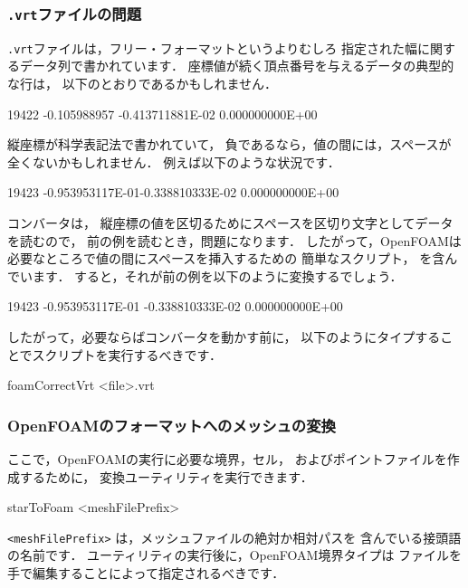 \subsubsection{\texttt{.vrt}ファイルの問題}
\label{sssec:5.5.2.6}
\texttt{.vrt}ファイルは，フリー・フォーマットというよりむしろ
指定された幅に関するデータ列で書かれています．
座標値が続く頂点番号を与えるデータの典型的な行は，
以下のとおりであるかもしれません．
\begin{OFverbatim}[file]
19422 -0.105988957 -0.413711881E-02 0.000000000E+00
\end{OFverbatim}
縦座標が科学表記法で書かれていて，
負であるなら，値の間には，スペースが全くないかもしれません．
例えば以下のような状況です．
\begin{OFverbatim}[file]
19423 -0.953953117E-01-0.338810333E-02 0.000000000E+00
\end{OFverbatim}
コンバータは，
縦座標の値を区切るためにスペースを区切り文字としてデータを読むので，
前の例を読むとき，問題になります．
したがって，OpenFOAMは必要なところで値の間にスペースを挿入するための
簡単なスクリプト，
%
%
を含んでいます．
すると，それが前の例を以下のように変換するでしょう．
\begin{OFverbatim}[file]
19423 -0.953953117E-01 -0.338810333E-02 0.000000000E+00
\end{OFverbatim}
したがって，必要ならばコンバータを動かす前に，
以下のようにタイプすることでスクリプトを実行するべきです．
\begin{OFverbatim}[terminal]
foamCorrectVrt <file>.vrt
\end{OFverbatim}

\subsubsection{OpenFOAMのフォーマットへのメッシュの変換}
\label{sssec:5.5.2.7}
ここで，OpenFOAMの実行に必要な境界，セル，
およびポイントファイルを作成するために，
変換ユーティリティを実行できます．
\begin{OFverbatim}[terminal]
starToFoam <meshFilePrefix>
\end{OFverbatim}
\texttt{<meshFilePrefix>} は，メッシュファイルの絶対か相対パスを
含んでいる接頭語の名前です．
ユーティリティの実行後に，OpenFOAM境界タイプは
ファイルを手で編集することによって指定されるべきです．


